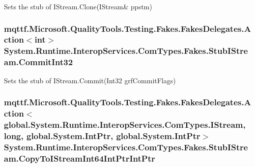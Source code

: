 Sets the stub of I\-Stream.\-Clone(I\-Stream\& ppstm)

\hypertarget{class_system_1_1_runtime_1_1_interop_services_1_1_com_types_1_1_fakes_1_1_stub_i_stream_ac63b446d0a624acc3fea51723b3f157e}{
\subsubsection[{Commit\-Int32}]{\setlength{\rightskip}{0pt plus 5cm}mqttf.\-Microsoft.\-Quality\-Tools.\-Testing.\-Fakes.\-Fakes\-Delegates.\-Action$<$int$>$ System.\-Runtime.\-Interop\-Services.\-Com\-Types.\-Fakes.\-Stub\-I\-Stream.\-Commit\-Int32}}\label{class_system_1_1_runtime_1_1_interop_services_1_1_com_types_1_1_fakes_1_1_stub_i_stream_ac63b446d0a624acc3fea51723b3f157e}


Sets the stub of I\-Stream.\-Commit(\-Int32 grf\-Commit\-Flags)

\hypertarget{class_system_1_1_runtime_1_1_interop_services_1_1_com_types_1_1_fakes_1_1_stub_i_stream_ab4d092a0fc7b45be6488a0b4bdb66094}{
\subsubsection[{Copy\-To\-I\-Stream\-Int64\-Int\-Ptr\-Int\-Ptr}]{\setlength{\rightskip}{0pt plus 5cm}mqttf.\-Microsoft.\-Quality\-Tools.\-Testing.\-Fakes.\-Fakes\-Delegates.\-Action$<$global.\-System.\-Runtime.\-Interop\-Services.\-Com\-Types.\-I\-Stream, long, global.\-System.\-Int\-Ptr, global.\-System.\-Int\-Ptr$>$ System.\-Runtime.\-Interop\-Services.\-Com\-Types.\-Fakes.\-Stub\-I\-Stream.\-Copy\-To\-I\-Stream\-Int64\-Int\-Ptr\-Int\-Ptr}}\label{class_system_1_1_runtime_1_1_interop_services_1_1_com_types_1_1_fakes_1_1_stub_i_stream_ab4d092a0fc7b45be6488a0b4bdb66094}


